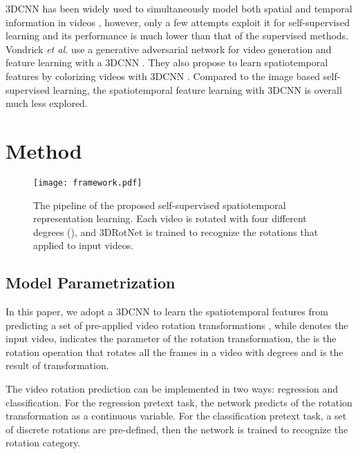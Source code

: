 \documentclass[10pt,twocolumn,letterpaper]{article}
\begin{document}
3DCNN has been widely used to simultaneously model both spatial and temporal information in videos \cite{I3D, 3DResNet, 3D, P3D, C3D, VYOLO}, however, only a few attempts exploit it for self-supervised learning \cite{videogan,videocolorize, CubicPuzzles} and its performance is much lower than that of the supervised methods. Vondrick \textit{et al.} use a generative adversarial network for video generation and feature learning with a 3DCNN \cite{videogan}. They also propose to learn spatiotemporal features by colorizing videos with 3DCNN \cite{videocolorize}. Compared to the image based self-supervised learning, the spatiotemporal feature learning with 3DCNN is overall much less explored. 

\section{Method}

\begin{figure*}[!ht]
\begin{center}
\texttt{[image: framework.pdf]}
\end{center}
\caption{The pipeline of the proposed self-supervised spatiotemporal representation learning. Each video is rotated with four different degrees (), and 3DRotNet is trained to recognize the rotations that applied to input videos.}
\label{fig:FrameWork}
\vspace{-10pt}
\end{figure*}

\subsection{Model Parametrization}

In this paper, we adopt a 3DCNN  to learn the spatiotemporal features from predicting a set of pre-applied video rotation transformations , while  denotes the input video,  indicates the parameter of the rotation transformation, the  is the rotation operation that rotates all the frames in a video with  degrees and  is the result of transformation.

The video rotation prediction can be implemented in two ways: regression and classification. For the regression pretext task, the network predicts  of the rotation transformation as a continuous variable. For the classification pretext task, a set of discrete rotations are pre-defined, then the network is trained to recognize the rotation category. 
\end{document}
